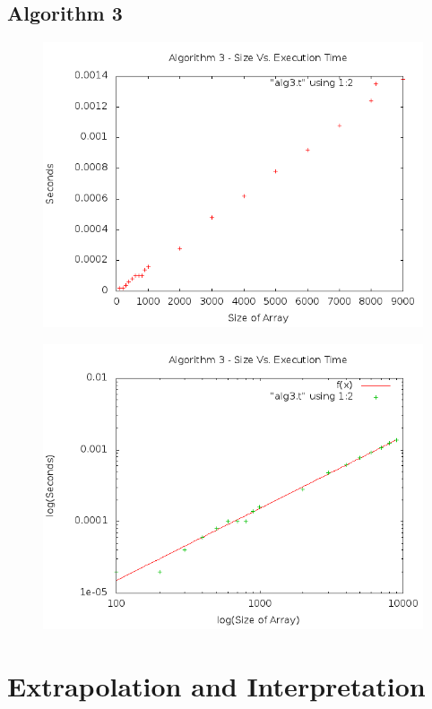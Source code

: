 \documentclass[a4paper,10pt]{article}
\begin{document}
		\subsection{Algorithm 3}
			\begin{figure}[!htb]
			\centering
			\includegraphics[scale=.5]{timingfiles/alg3plot.png}
			\end{figure}
			\begin{figure}[!htb]
			\centering
			\includegraphics[scale=.5]{timingfiles/alg3plotlog.png}
			\end{figure}

	\newpage
	\section{Extrapolation and Interpretation}
\end{document}
